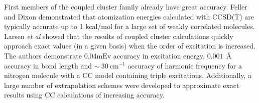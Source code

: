 First members of the coupled cluster family already have great accuracy. Feller 
and Dixon demonstrated that atomization energies calculated with CCSD(T) are 
typically accurate up to 1 kcal/mol for a large set of weakly correlated 
molecules.\cite{feller2001extended} Larsen \emph{et al} \cite{larsen2000full} 
showed that the results of coupled cluster calculations quickly approach exact 
values (in a given basis) when the order of excitation is increased. The authors 
demonstrate $0.04 \mathrm{mEv}$ accuracy in excitation energy, $0.001 ~~ 
\mbox{\AA}$ 
accuracy in bond length and $\sim ~ 30 ~ \mathrm{cm^{-1}}$ accuracy of 
harmonic frequency for a nitrogen molecule with a CC model containing triple 
excitations. Additionally, a large number of extrapolation schemes were 
developed to approximate exact results using CC calculations of 
increasing accuracy.\cite{helgaker1997basis, halkier1998basis, 
schwenke2005extrapolation}  

